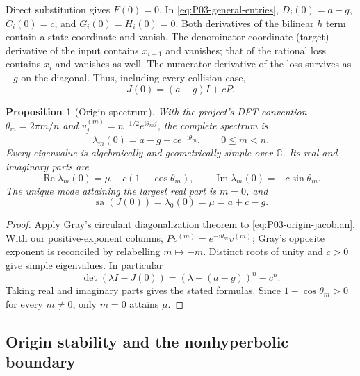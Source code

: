 \documentclass[11pt]{article}
\let\OriginalCite\cite
\renewcommand{\cite}[2][]{%
  \textcolor{CitationRed}{%
    \if\relax\detokenize{#1}\relax
      \OriginalCite{#2}%
    \else
      \OriginalCite[#1]{#2}%
    \fi}}
\newcommand{\C}{\mathbb{C}}
\newcommand{\ii}{\mathrm{i}}
\DeclareMathOperator{\sa}{sa}
\DeclareMathOperator{\Ree}{Re}
\DeclareMathOperator{\Imm}{Im}
\newtheorem{proposition}[theorem]{Proposition}
\theoremstyle{definition}
\theoremstyle{remark}
\begin{document}
Direct substitution gives $F(0)=0$. In
\eqref{eq:P03-general-entries}, $D_i(0)=a-g$, $C_i(0)=c$, and
$G_i(0)=H_i(0)=0$. Both derivatives of the bilinear $h$ term
contain a state coordinate and vanish. The denominator-coordinate
(target) derivative of the input contains $x_{i-1}$ and vanishes;
that of the rational loss contains $x_i$ and vanishes as well.
The numerator derivative of the loss survives as $-g$ on the
 diagonal. Thus, including every collision case,
\begin{equation}
 \boxed{J(0)=(a-g)I+cP.}
 \label{eq:P03-origin-jacobian}
\end{equation}

\begin{proposition}[Origin spectrum]
\label{prop:P03-origin-spectrum}
With the project's DFT convention $\theta_m=2\pi m/n$ and
$v^{(m)}_j=n^{-1/2}e^{\ii\theta_m j}$, the complete spectrum is
\begin{equation}
 \boxed{\lambda_m(0)=a-g+c e^{-\ii\theta_m},\qquad 0\le m<n.}
 \label{eq:P03-origin-spectrum}
\end{equation}
Every eigenvalue is algebraically and geometrically simple over $\C$.
Its real and imaginary parts are
\begin{equation}
 \Ree\lambda_m(0)=\mu-c(1-\cos\theta_m),\qquad
 \Imm\lambda_m(0)=-c\sin\theta_m.
 \label{eq:P03-origin-parts}
\end{equation}
The unique mode attaining the largest real part is $m=0$, and
\begin{equation}
 \boxed{\sa(J(0))=\lambda_0(0)=\mu=a+c-g.}
 \label{eq:P03-abscissa}
\end{equation}
\end{proposition}
\begin{proof}
Apply Gray's circulant diagonalization theorem
\cite[Theorem~3.1]{Gray2006} to \eqref{eq:P03-origin-jacobian}.
With our positive-exponent columns, $Pv^{(m)}=e^{-\ii\theta_m}v^{(m)}$;
Gray's opposite exponent is reconciled by relabelling $m\mapsto -m$.
Distinct roots of unity and $c>0$ give simple eigenvalues. In particular
\begin{equation}
 \det(\lambda I-J(0))=(\lambda-(a-g))^n-c^n.
 \label{eq:P03-characteristic}
\end{equation}
Taking real and imaginary parts gives the stated formulas. Since
$1-\cos\theta_m>0$ for every $m\ne0$, only $m=0$ attains $\mu$.
\end{proof}

\subsection{Origin stability and the nonhyperbolic boundary}
\label{slot:P03-2}
\end{document}
